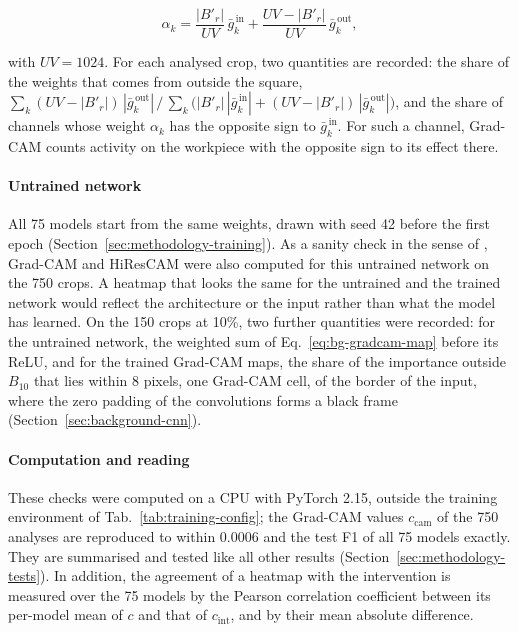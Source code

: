 \begin{equation}
\alpha_k = \frac{|B'_r|}{UV}\, \bar{g}^{\,\mathrm{in}}_k +
\frac{UV - |B'_r|}{UV}\, \bar{g}^{\,\mathrm{out}}_k,
\label{eq:weight-split}
\end{equation}

with $UV = 1024$. For each analysed crop, two quantities are recorded: the share of the
weights that comes from outside the square,
$\sum_k (UV - |B'_r|)\, |\bar{g}^{\,\mathrm{out}}_k| \,/\, \sum_k \big(|B'_r|\,
|\bar{g}^{\,\mathrm{in}}_k| + (UV - |B'_r|)\, |\bar{g}^{\,\mathrm{out}}_k|\big)$, and the share
of channels whose weight $\alpha_k$ has the opposite sign to $\bar{g}^{\,\mathrm{in}}_k$.
For such a channel, Grad-CAM counts activity on the workpiece with the opposite sign
to its effect there.

\paragraph{Untrained network}
\label{sec:methodology-untrained}
All 75 models start from the same weights, drawn with seed 42 before the first epoch
(Section~\ref{sec:methodology-training}). As a sanity check in the sense of \citet{adebayo2018sanity}, Grad-CAM and HiResCAM were also computed for this
untrained network on the 750 crops. A heatmap that looks the same for the untrained
and the trained network would reflect the architecture or the input rather than what
the model has learned. On the 150 crops at 10\%, two further quantities were recorded:
for the untrained network, the weighted sum of Eq.~\eqref{eq:bg-gradcam-map} before its
ReLU, and for the trained Grad-CAM maps, the share of the importance outside $B_{10}$
that lies within 8 pixels, one Grad-CAM cell, of the border of the input, where the zero
padding of the convolutions forms a black frame (Section~\ref{sec:background-cnn}).

\paragraph{Computation and reading}
These checks were computed on a CPU with PyTorch 2.15, outside the training environment
of Tab.~\ref{tab:training-config}; the Grad-CAM values $c_{\mathrm{cam}}$ of the 750
analyses are reproduced to within 0.0006 and the test F1 of all 75 models exactly. They
are summarised and tested like all other results (Section~\ref{sec:methodology-tests}).
In addition, the agreement of a heatmap with the intervention is measured over the 75
models by the Pearson correlation coefficient between its per-model mean of $c$ and
that of $c_{\mathrm{int}}$, and by their mean absolute difference.

